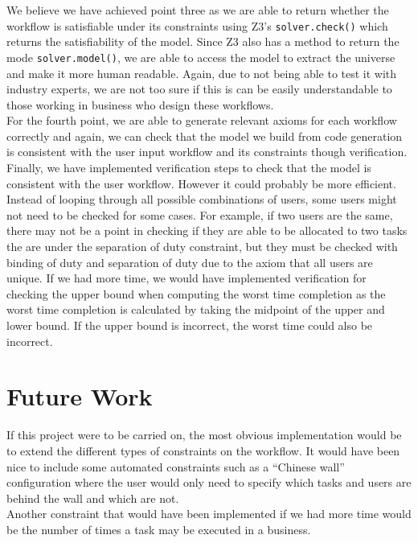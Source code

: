 \documentclass[a4paper]{report}
\begin{document}
We believe we have achieved point three as we are able to return whether the workflow is satisfiable under its constraints using Z3's \texttt{solver.check()} which returns the satisfiability of the model. Since Z3 also has a method to return the mode \texttt{solver.model()}, we are able to access the model to extract the universe and make it more human readable. Again, due to not being able to test it with industry experts, we are not too sure if this is can be easily understandable to those working in business who design these workflows.  \\

For the fourth point, we are able to generate relevant axioms for each workflow correctly and again, we can check that the model we build from code generation is consistent with the user input workflow and its constraints though verification.\\

Finally, we have implemented verification steps to check that the model is consistent with the user workflow. However it could probably be more efficient. Instead of looping through all possible combinations of users, some users might not need to be checked for some cases. For example, if two users are the same, there may not be a point in checking if they are able to be allocated to two tasks the are under the separation of duty constraint, but they must be checked with binding of duty and separation of duty due to the axiom that all users are unique. If we had more time, we would have implemented verification for checking the upper bound when computing the worst time completion as the worst time completion is calculated by taking the midpoint of the upper and lower bound. If the upper bound is incorrect, the worst time could also be incorrect. \\

\section{Future Work}
If this project were to be carried on, the most obvious implementation would be to extend the different types of constraints on the workflow. It would have been nice to include some automated constraints such as a ``Chinese wall'' configuration where the user would only need to specify which tasks and users are behind the wall and which are not. \\

Another constraint that would have been implemented if we had more time would be the number of times a task may be executed in a business. \\
\end{document}
